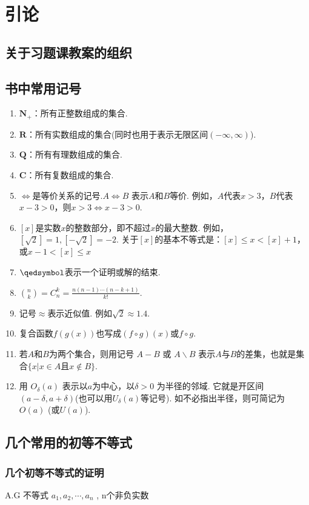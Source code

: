 \section{引论}
\subsection{关于习题课教案的组织}
\subsection{书中常用记号}
\begin{enumerate}
	\item $ \mathbf{N}_{+} $：所有正整数组成的集合.
	\item $ \mathbf{R} $：所有实数组成的集合(同时也用于表示无限区间$( -\infty,\infty )$).
	\item $ \mathbf{Q} $：所有有理数组成的集合.
	\item $ \mathbf{C} $：所有复数组成的集合.
	\item $ \iff $是等价关系的记号.$ A\iff B $ 表示$ A $和$ B $等价. 例如，$ A $代表$ x > 3 $，$ B $代表$ x-3>0 $，则$ x>3\iff x-3>0 $.
	\item $ [x] $是实数$ x $的整数部分，即不超过$ x $的最大整数. 例如，$ [\sqrt{2}] = 1, [-\sqrt{2}] = -2 $. 关于$ [x] $的基本不等式是：$ [x]\le x < [x] + 1 $，或$ x-1<[x]\le x $
	\item $ \qedsymbol $表示一个证明或解的结束.
	\item $ {n \choose k} = C_n^k = \frac{n(n-1)\cdots(n-k+1)}{k!}$.
	\item 记号$ \approx $表示近似值. 例如$ \sqrt{2}\approx 1.4 $.
	\item 复合函数$ f(g(x)) $也写成$ (f\circ g)(x) $或$ f \circ g $.
	\item 若$ A $和$ B $为两个集合，则用记号 $ A-B $ 或 $ A \backslash B $ 表示$ A $与$ B $的差集，也就是集合$ \{x|x\in A \text{且} x\notin B\} $.
	\item 用 $ O_\delta (a) $ 表示以$ a $为中心，以$ \delta >0 $ 为半径的邻域. 它就是开区间$ (a-\delta, a+\delta) $(也可以用$ U_\delta (a) $等记号). 如不必指出半径，则可简记为$ O(a)$ (或$ U(a) $).
\end{enumerate}


\subsection{几个常用的初等不等式}
\subsubsection{几个初等不等式的证明}
A.G 不等式 $ a_1,a_2,\cdots,a_n $ , n个非负实数

